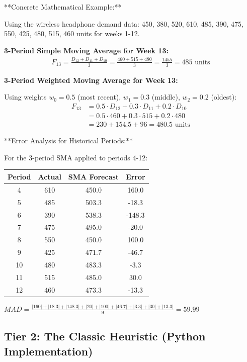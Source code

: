 \documentclass{article}
\begin{document}
**Concrete Mathematical Example:**

Using the wireless headphone demand data: 450, 380, 520, 610, 485, 390, 475, 550, 425, 480, 515, 460 units for weeks 1-12.

\textbf{3-Period Simple Moving Average for Week 13:}
\begin{align}
F_{13} = \frac{D_{12} + D_{11} + D_{10}}{3} = \frac{460 + 515 + 480}{3} = \frac{1455}{3} = 485 \text{ units}
\end{align}

\textbf{3-Period Weighted Moving Average for Week 13:}

Using weights $w_0 = 0.5$ (most recent), $w_1 = 0.3$ (middle), $w_2 = 0.2$ (oldest):
\begin{align}
F_{13} &= 0.5 \cdot D_{12} + 0.3 \cdot D_{11} + 0.2 \cdot D_{10}\\
&= 0.5 \cdot 460 + 0.3 \cdot 515 + 0.2 \cdot 480\\
&= 230 + 154.5 + 96 = 480.5 \text{ units}
\end{align}

**Error Analysis for Historical Periods:**

For the 3-period SMA applied to periods 4-12:

\begin{center}
\begin{tabular}{cccc}
\toprule
Period & Actual & SMA Forecast & Error \\
\midrule
4 & 610 & 450.0 & 160.0 \\
5 & 485 & 503.3 & -18.3 \\
6 & 390 & 538.3 & -148.3 \\
7 & 475 & 495.0 & -20.0 \\
8 & 550 & 450.0 & 100.0 \\
9 & 425 & 471.7 & -46.7 \\
10 & 480 & 483.3 & -3.3 \\
11 & 515 & 485.0 & 30.0 \\
12 & 460 & 473.3 & -13.3 \\
\bottomrule
\end{tabular}
\end{center}

$MAD = \frac{|160| + |18.3| + |148.3| + |20| + |100| + |46.7| + |3.3| + |30| + |13.3|}{9} = 59.99$

\subsection{Tier 2: The Classic Heuristic (Python Implementation)}
\end{document}

